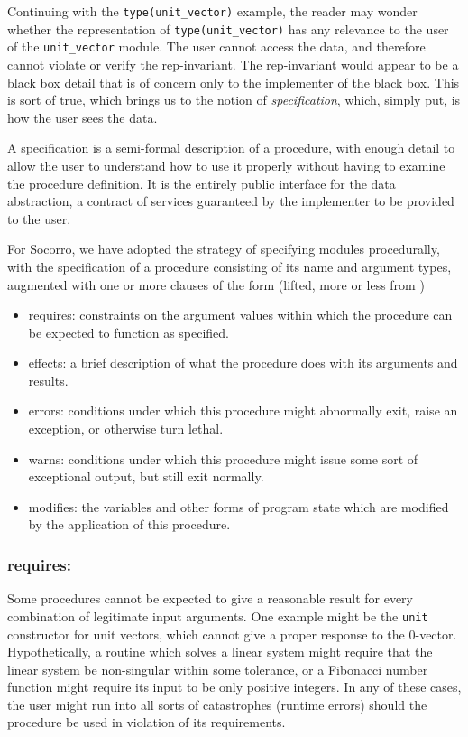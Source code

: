 \label{specsec}
Continuing with the \verb+type(unit_vector)+ example, the reader may
wonder whether the representation of \verb+type(unit_vector)+ has any
relevance to the user of the \verb+unit_vector+ module.  The user
cannot access the data, and therefore cannot violate or verify the
rep-invariant.  The rep-invariant would appear to be a black box
detail that is of concern only to the implementer of the black box.
This is sort of true, which brings us to the notion of {\em
specification}, which, simply put, is how the user sees the data.

A specification is a semi-formal description of a procedure, with
enough detail to allow the user to understand how to use it properly
without having to examine the procedure definition.  It is the entirely
public interface for the data abstraction, a contract of services
guaranteed by the implementer to be provided to the user.

For Socorro, we have adopted the strategy of specifying modules
procedurally, with the specification of a procedure consisting of
its name and argument types, augmented with one or more clauses
of the form (lifted, more or less from \cite{LiskovGuttag.RedBook})
\begin{itemize}
\item requires: constraints on the argument values within which the
procedure can be expected to function as specified.
\item effects: a brief description of what the procedure does with
its arguments and results.
\item errors: conditions under which this procedure might abnormally
exit, raise an exception, or otherwise turn lethal.
\item warns: conditions under which this procedure might issue some
sort of exceptional output, but still exit normally.
\item modifies: the variables and other forms of program state which
are modified by the application of this procedure.
\end{itemize}

\subsubsection{requires:}

Some procedures cannot be expected to give a reasonable result for
every combination of legitimate input arguments.  One example might be
the \verb+unit+ constructor for unit vectors, which cannot give a
proper response to the $0$-vector.  Hypothetically, a routine which
solves a linear system might require that the linear system be
non-singular within some tolerance, or a Fibonacci number function
might require its input to be only positive integers.  In any of these
cases, the user might run into all sorts of catastrophes (runtime
errors) should the procedure be used in violation of its requirements.


